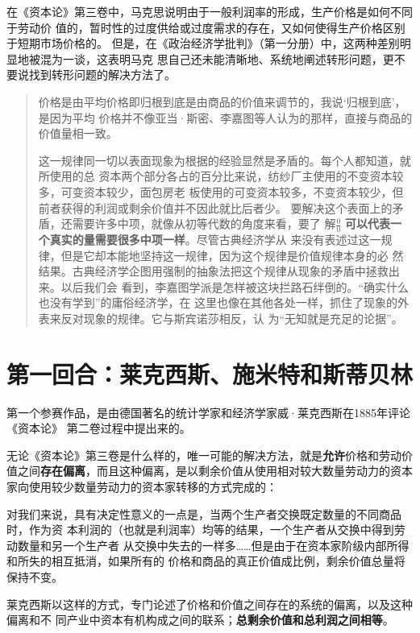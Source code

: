 在《资本论》第三卷中，马克思说明由于一般利润率的形成，生产价格是如何不同于劳动价
值的，暂时性的过度供给或过度需求的存在，又如何使得生产价格区别于短期市场价格的。
但是，在《政治经济学批判》（第一分册）中，这两种差别明显地被混为一谈，这表明马克
思自己还未能清晰地、系统地阐述转形问题，更不要说找到转形问题的解决方法了。

\begin{quotation}
  价格是由平均价格即归根到底是由商品的价值来调节的，我说‘归根到底’，是因为平均
价格并不像亚当·斯密、李嘉图等人认为的那样，直接与商品的价值量相一致。

这一规律同一切以表面现象为根据的经验显然是矛盾的。每个人都知道，就所使用的总
资本两个部分各占的百分比来说，纺纱厂主使用的不变资本较多，可变资本较少，面包房老
板使用的可变资本较多，不变资本较少，但前者获得的利润或剩余价值并不因此就比后者少。
要解决这个表面上的矛盾，还需要许多中项，就像从初等代数的角度来看，要了
解$\frac{0}{0}$ \textbf{可以代表一个真实的量需要很多中项一样}。尽管古典经济学从
来没有表述过这一规律，但是它却本能地坚持这一规律，因为这个规律是价值规律本身的必
然结果。古典经济学企图用强制的抽象法把这个规律从现象的矛盾中拯救出来。以后我们会
看到，李嘉图学派是怎样被这块拦路石绊倒的。“确实什么也没有学到”的庸俗经济学，在
这里也像在其他各处一样，抓住了现象的外表来反对现象的规律。它与斯宾诺莎相反，认
为“无知就是充足的论据”。
\end{quotation}

\section{第一回合：莱克西斯、施米特和斯蒂贝林}
第一个参赛作品，是由德国著名的统计学家和经济学家威·莱克西斯在1885年评论《资本论》
第二卷过程中提出来的。

无论《资本论》第三卷是什么样的，唯一可能的解决方法，就是\textbf{允许}价格和劳动价值之间\textbf{存在偏离}，而且这种偏离，是以剩余价值从使用相对较大数量劳动力的资本家向使用较少数量劳动力的资本家转移的方式完成的：

对我们来说，具有决定性意义的一点是，当两个生产者交换既定数量的不同商品时，作为资
本利润的（也就是利润率）均等的结果，一个生产者从交换中得到劳动数量和另一个生产者
从交换中失去的一样多……但是由于在资本家阶级内部所得和所失的相互抵消，如果所有的
价格和商品的真正价值成比例，剩余价值总量将保持不变。

莱克西斯以这样的方式，专门论述了价格和价值之间存在的系统的偏离，以及这种偏离和不
同产业中资本有机构成之间的联系；\textbf{总剩余价值和总利润之间相等}。

